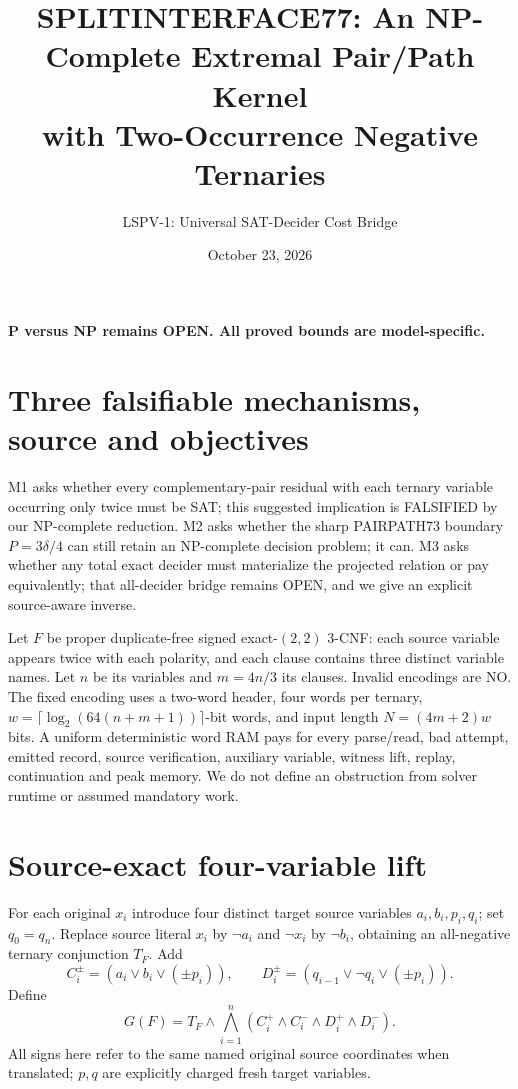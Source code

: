\documentclass[11pt]{article}
\title{SPLITINTERFACE77: An NP-Complete Extremal Pair/Path Kernel\\with Two-Occurrence Negative Ternaries}
\author{LSPV-1: Universal SAT-Decider Cost Bridge}
\date{October 23, 2026}
\begin{document}
\maketitle
\begin{center}\textbf{P versus NP remains OPEN. All proved bounds are model-specific.}\end{center}

\section{Three falsifiable mechanisms, source and objectives}
M1 asks whether every complementary-pair residual with each ternary variable occurring only twice must be SAT; this suggested implication is FALSIFIED by our NP-complete reduction. M2 asks whether the sharp PAIRPATH73 boundary $P=3\delta/4$ can still retain an NP-complete decision problem; it can. M3 asks whether any total exact decider must materialize the projected relation or pay equivalently; that all-decider bridge remains OPEN, and we give an explicit source-aware inverse.

Let $F$ be proper duplicate-free signed exact-$(2,2)$ 3-CNF: each source variable appears twice with each polarity, and each clause contains three distinct variable names. Let $n$ be its variables and $m=4n/3$ its clauses. Invalid encodings are NO. The fixed encoding uses a two-word header, four words per ternary, $w=\lceil\log_2(64(n+m+1))\rceil$-bit words, and input length $N=(4m+2)w$ bits. A uniform deterministic word RAM pays for every parse/read, bad attempt, emitted record, source verification, auxiliary variable, witness lift, replay, continuation and peak memory. We do not define an obstruction from solver runtime or assumed mandatory work.

\section{Source-exact four-variable lift}
For each original $x_i$ introduce four distinct target source variables $a_i,b_i,p_i,q_i$; set $q_0=q_n$. Replace source literal $x_i$ by $\neg a_i$ and $\neg x_i$ by $\neg b_i$, obtaining an all-negative ternary conjunction $T_F$. Add
\[
C_i^\pm=(a_i\vee b_i\vee(\pm p_i)),\qquad
D_i^\pm=(q_{i-1}\vee\neg q_i\vee(\pm p_i)).
\]
Define
\[
G(F)=T_F\land\bigwedge_{i=1}^{n}
(C_i^+\land C_i^-\land D_i^+\land D_i^-). \tag{1}
\]
All signs here refer to the same named original source coordinates when translated; $p,q$ are explicitly charged fresh target variables.
\end{document}
